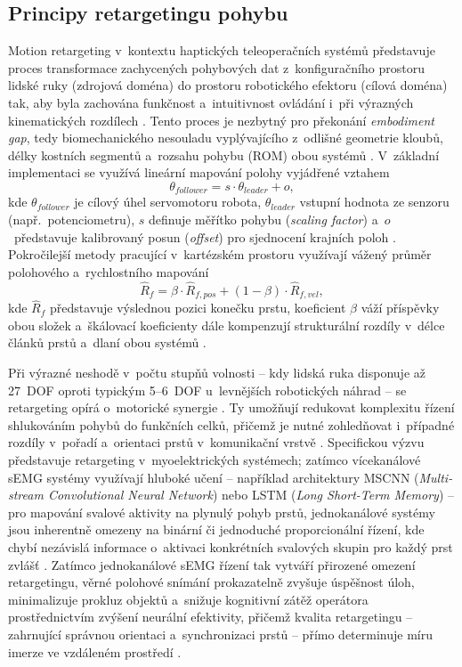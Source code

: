 \subsection{Principy retargetingu pohybu}
Motion retargeting v~kontextu haptických teleoperačních systémů představuje proces transformace zachycených pohybových dat z~konfiguračního prostoru lidské ruky (zdrojová doména) do prostoru robotického efektoru (cílová doména) tak, aby byla zachována funkčnost a~intuitivnost ovládání i~při výrazných kinematických rozdílech \cite{GIUDICI2025, Zhang2025}.
Tento proces je nezbytný pro překonání \textit{embodiment gap}, tedy biomechanického nesouladu vyplývajícího z~odlišné geometrie kloubů, délky kostních segmentů a~rozsahu pohybu (ROM) obou systémů \cite{Coppola2022920, GIUDICI2025, Zhang2025}.
V~základní implementaci se využívá lineární mapování polohy vyjádřené vztahem
%
\begin{equation}
    \theta_{follower} = s \cdot \theta_{leader} + o,
\end{equation}
%
kde $\theta_{follower}$ je cílový úhel servomotoru robota, $\theta_{leader}$ vstupní hodnota ze senzoru (např.\ potenciometru), $s$ definuje měřítko pohybu (\textit{scaling factor}) a~$o$~představuje kalibrovaný posun (\textit{offset}) pro sjednocení krajních poloh \cite{Mizrahi2023, Zhang2025}.
Pokročilejší metody pracující v~kartézském prostoru využívají vážený průměr polohového a~rychlostního mapování
%
\begin{equation}
    \hat{R}_f = \beta \cdot \hat{R}_{f,pos} + (1-\beta) \cdot \hat{R}_{f,vel},
\end{equation}
%
kde $\hat{R}_f$ představuje výslednou pozici konečku prstu, koeficient $\beta$ váží příspěvky obou složek a~škálovací koeficienty dále kompenzují strukturální rozdíly v~délce článků prstů a~dlaní obou systémů \cite{Coppola2022920}.

Při výrazné neshodě v~počtu stupňů volnosti -- kdy lidská ruka disponuje až 27~DOF oproti typickým 5--6~DOF u~levnějších robotických náhrad -- se retargeting opírá o~motorické synergie \cite{Belcamino2024, GIUDICI2025, Mizrahi2023, Xiong2024}.
Ty umožňují redukovat komplexitu řízení shlukováním pohybů do funkčních celků, přičemž je nutné zohledňovat i~případné rozdíly v~pořadí a~orientaci prstů v~komunikační vrstvě \cite{Mizrahi2023, Zhang2025}.
Specifickou výzvu představuje retargeting v~myoelektrických systémech; zatímco vícekanálové sEMG systémy využívají hluboké učení -- například architektury MSCNN (\textit{Multi-stream Convolutional Neural Network}) nebo LSTM (\textit{Long Short-Term Memory}) -- pro mapování svalové aktivity na plynulý pohyb prstů, jednokanálové systémy jsou inherentně omezeny na binární či jednoduché proporcionální řízení, kde chybí nezávislá informace o~aktivaci konkrétních svalových skupin pro každý prst zvlášť \cite{Mizrahi2023, Sun2023, Xiong2024}.
Zatímco jednokanálové sEMG řízení tak vytváří přirozené omezení retargetingu, věrné polohové snímání prokazatelně zvyšuje úspěšnost úloh, minimalizuje prokluz objektů a~snižuje kognitivní zátěž operátora prostřednictvím zvýšení neurální efektivity, přičemž kvalita retargetingu -- zahrnující správnou orientaci a~synchronizaci prstů -- přímo determinuje míru imerze ve vzdáleném prostředí \cite{Coppola2022920, Li2025, Thomas2023110, Zhang2025}.
